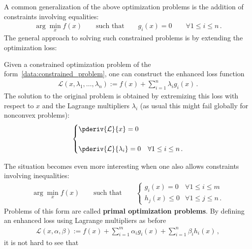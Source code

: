     A common generalization of the above optimization problems is the addition of constraints involving equalities:
    \begin{gather}
        \label{data:constrained_problem}
        \arg\min_x f(x) \qquad\text{such that}\qquad g_i(x)=0\qquad\forall 1\leq i\leq n\,.
    \end{gather}
    The general approach to solving such constrained problems is by extending the optimization loss:
    \begin{method}
        Given a constrained optimization problem of the form~\eqref{data:constrained_problem}, one can construct the enhanced loss function
        \begin{gather}
            \mathcal{L}(x,\lambda_1,\ldots,\lambda_n) := f(x) + \sum_{i=1}^n\lambda_ig_i(x)\,.
        \end{gather}
        The solution to the original problem is obtained by extremizing this loss with respect to $x$ and the Lagrange multipliers $\lambda_i$ (as usual this might fail globally for nonconvex problems):
        \begin{gather}
            \begin{cases}
                \pderiv{\mathcal{L}}{x} = 0\\\\
                \pderiv{\mathcal{L}}{\lambda_i} = 0&\forall1\leq i\leq n\,.
            \end{cases}
        \end{gather}
    \end{method}
    The situation becomes even more interesting when one also allows constraints involving inequalities:
    \begin{gather}
        \label{data:constrained_optimization}
        \arg\min_xf(x)\qquad\text{such that}\qquad
        \begin{cases}
            g_i(x)=0&\forall 1\leq i\leq m\\
            h_j(x)\leq0&\forall 1\leq j\leq n\,.
        \end{cases}
    \end{gather}
    Problems of this form are called \textbf{primal optimization problems}. By defining an enhanced loss using Lagrange multipliers as before
    \begin{gather}
        \mathcal{L}(x,\alpha,\beta) := f(x) + \sum_{i=1}^m\alpha_ig_i(x) + \sum_{i=1}^n\beta_ih_i(x)\,,
    \end{gather}
    it is not hard to see that

